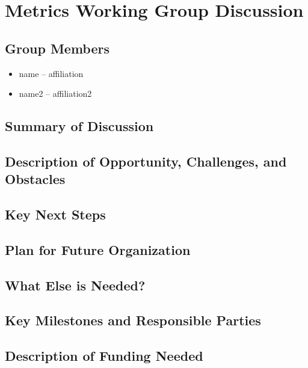 \section{Metrics Working Group Discussion}
\label{sec:appendix_metrics}


\subsection{Group Members}

\begin{itemize}
\item name -- affiliation
\item name2 -- affiliation2
\end{itemize}

\subsection{Summary of Discussion}

\subsection{Description of Opportunity, Challenges, and Obstacles}


\subsection{Key Next Steps}


\subsection{Plan for Future Organization}


\subsection{What Else is Needed?}


\subsection{Key Milestones and Responsible Parties}


\subsection{Description of Funding Needed}
